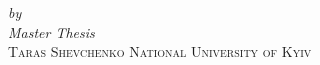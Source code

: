 \begin{titlepage}
  \vspace*{5cm}
  \makeatletter
  \begin{center}
    \begin{Huge}
      \@title
    \end{Huge}\\
    \begin{Large}
      \@subtitle
    \end{Large}\\
    \emph{by}\\
    \@author
    \vfill
    \textit{Master Thesis}\\
    \textsc{Taras Shevchenko National University of Kyiv}
  \end{center}
  \makeatother
\end{titlepage}
